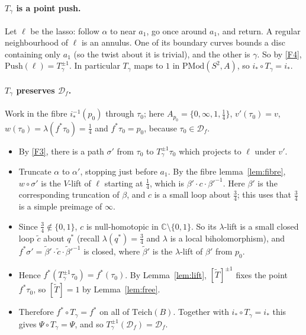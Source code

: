 \documentclass[11pt]{article}
\theoremstyle{definition}
\newcommand{\Teich}{\mathrm{Teich}}
\newcommand{\PMod}{\mathrm{PMod}}
\newcommand{\D}{\mathcal D}
\newcommand{\Push}{\mathrm{Push}}
\begin{document}
\paragraph{$T_\gamma$ is a point push.} Let $\ell$ be the lasso: follow $\alpha$ to near $a_1$, go once around $a_1$, and return. A regular neighbourhood of $\ell$ is an annulus. One of its boundary curves bounds a disc containing only $a_1$ (so the twist about it is trivial), and the other is $\gamma$. So by \ref{F4}, $\Push(\ell)=T_\gamma^{\pm1}$. In particular $T_\gamma$ maps to $1$ in $\PMod(S^2,A)$, so $i_*\circ T_\gamma=i_*$.

\paragraph{$T_\gamma$ preserves $\D_f$.} Work in the fibre $i_*^{-1}(p_0)$ through $\tau_0$; here $A_{p_0}=\{0,\infty,1,\tfrac14\}$, $v'(\tau_0)=v$, $w(\tau_0)=\lambda(f^*\tau_0)=\tfrac14$ and $f^*\tau_0=p_0$, because $\tau_0\in\D_f$.
\begin{itemize}[nosep]
\item By \ref{F3}, there is a path $\sigma'$ from $\tau_0$ to $T_\gamma^{\pm1}\tau_0$ which projects to $\ell$ under $v'$.
\item Truncate $\alpha$ to $\alpha'$, stopping just before $a_1$. By the fibre lemma~\ref{lem:fibre}, $w\circ\sigma'$ is the $V$-lift of $\ell$ starting at $\tfrac14$, which is $\beta'\cdot c\cdot\beta'^{-1}$. Here $\beta'$ is the corresponding truncation of $\beta$, and $c$ is a small loop about $\tfrac34$; this uses that $\tfrac34$ is a simple preimage of $\infty$.
\item Since $\tfrac34\notin\{0,1\}$, $c$ is null-homotopic in $\mathbb C\setminus\{0,1\}$. So its $\lambda$-lift is a small closed loop $\tilde c$ about $q^*$ (recall $\lambda(q^*)=\tfrac34$ and $\lambda$ is a local biholomorphism), and $f^*\sigma'=\tilde\beta'\cdot\tilde c\cdot\tilde\beta'^{-1}$ is closed, where $\tilde\beta'$ is the $\lambda$-lift of $\beta'$ from $p_0$.
\item Hence $f^*(T_\gamma^{\pm1}\tau_0)=f^*(\tau_0)$. By Lemma~\ref{lem:lift}, $[\tilde T]^{\pm1}$ fixes the point $f^*\tau_0$, so $[\tilde T]=1$ by Lemma~\ref{lem:free}.
\item Therefore $f^*\circ T_\gamma=f^*$ on all of $\Teich(B)$. Together with $i_*\circ T_\gamma=i_*$ this gives $\Psi\circ T_\gamma=\Psi$, and so $T_\gamma^{\pm1}(\D_f)=\D_f$.
\end{itemize}
\end{document}
